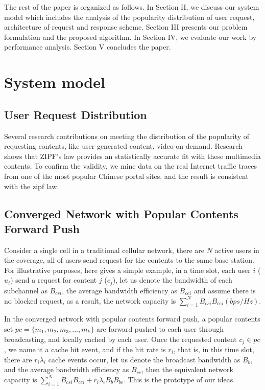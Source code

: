 \documentclass[conference]{IEEEtran}
\begin{document}
The rest of the paper is organized as follows. In Section II, we discuss our system model which includes the analysis of the popularity distribution of user request, architecture of request and response scheme. Section III presents our problem formulation and the proposed algorithm. In Section IV, we evaluate our work by performance analysis. Section V concludes the paper. 
 

\section{System model}
\subsection{User Request Distribution}
Several research contributions on meeting the distribution of the popularity of requesting contents, like user generated content, video-on-demand\cite{cha2007tube}. Research shows that ZIPF's law provides an statistically accurate fit with these multimedia contents\cite{wang2014push}. To confirm the validity, we mine data on the real Internet traffic traces from one of the most popular Chinese portal sites, and the result is consistent with the zipf law.

\subsection{Converged Network with Popular Contents Forward Push}
Consider a single cell in a traditional cellular network, there are $N$ active users in the coverage, all of users send request for the contents to the same base station. For illustrative purposes, here gives a simple example, in a time slot, each user $i$ ($u_i$) send a request for content $j$ ($c_j$), let us denote the bandwidth of each subchannel as $B_{csi}$, the average bandwidth efficiency as $B_{cei}$ and assume there is no blocked request, as a result, the network capacity is $\sum_{i=1}^N {B_{csi}B_{cei}(bps/Hz)}$.

In the converged network with popular contents forward push, a popular contents set  $pc=\{m_1,m_2,m_3,...,m_k\}$ are forward pushed to each user through broadcasting, and locally cached by each user. Once the requested content $c_j \in pc$, we name it a cache hit event, and if the hit rate is $r_i$, that is, in this time slot, there are $r_i\lambda_i$ cache events occur, let us denote the broadcast bandwidth as $B_b$, and the average bandwidth efficiency as $B_{ce}$, then the equivalent network capacity is $\sum_{i=1}^N {B_{csi}B_{cei}} + r_i\lambda_i B_bB_{be}$. This is the prototype of our ideas.
\end{document}
